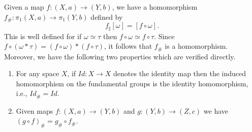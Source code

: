 \documentclass[../main.tex]{subfiles}
\begin{document}
\begin{definition}{}{}
    Given a map $f:(X,a)\longrightarrow(Y,b)$, we have a homomorphism $f_{\#}:\pi_{1}(X,a)\longrightarrow\pi_{1}(Y,b)$ defined by
\begin{equation}
f_{\sharp }[\omega]=[f\circ\omega].
\end{equation}
This is well defined for if $\omega\simeq\tau$ then $f\circ\omega\simeq f\circ\tau$. Since $f\circ(\omega*\tau)=(f\circ\omega)*(f\circ\tau)$, it follows that $f_{\#}$ is a homomorphism. Moreover, we have the following two properties which are verified directly.
\begin{enumerate}
\item For any space $X$, if $Id:X\longrightarrow X$ denotes the identity map then the induced homomorphism on the fundamental groups is the identity homomorphism, i.e., $Id_{\#}=Id$.
\item Given maps $f:(X,a)\longrightarrow(Y,b)$ and $g:(Y,b)\longrightarrow(Z,c)$ we have $(g\circ f)_{\#}=g_{\#}\circ f_{\#}$.
\end{enumerate}
\end{definition}
\end{document}
